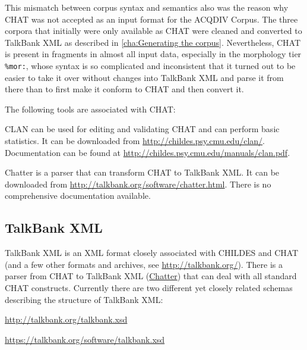 \documentclass[a4paper, 11pt]{book}
\begin{document}

This mismatch between corpus syntax and semantics also was the reason why CHAT was not accepted as an input format for the ACQDIV Corpus. The three corpora that initially were only available as CHAT were cleaned and converted to TalkBank XML as described in \autoref{cha:Generating the corpus}. Nevertheless, CHAT is present in fragments in almost all input data, especially in the morphology tier \texttt{\%mor:}, whose syntax is so complicated and inconsistent that it turned out to be easier to take it over without changes into TalkBank XML and parse it from there than to first make it conform to CHAT and then convert it. 

The following tools are associated with CHAT: 

\begin{itemize*}
	\item CLAN can be used for editing and validating CHAT and can perform basic statistics. It can be downloaded from \url{http://childes.psy.cmu.edu/clan/}.
		Documentation can be found at \url{http://childes.psy.cmu.edu/manuals/clan.pdf}. 
	\item Chatter is a parser that can transform CHAT to TalkBank XML. It can be downloaded from \url{http://talkbank.org/software/chatter.html}. 
		There is no comprehensive documentation available. 
\end{itemize*}


\subsection{TalkBank XML}
\label{subsec:TalkBank XML}

TalkBank XML is an XML format closely associated with CHILDES and CHAT (and a few other formats and archives, see \url{http://talkbank.org/}). There is a parser from CHAT to TalkBank XML (\href{http://talkbank.org/software/chatter.html}{Chatter}) that can deal with all standard CHAT constructs. Currently there are two different yet closely related schemas describing the structure of TalkBank XML:

\begin{itemize*}
	\item \url{http://talkbank.org/talkbank.xsd}
	\item \url{https://talkbank.org/software/talkbank.xsd}
\end{itemize*}
\end{document}
